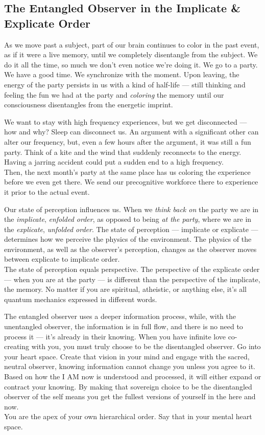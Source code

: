 \subsection*{The Entangled Observer in the Implicate \& Explicate
Order}\label{the-entangled-observer-in-the-implicate-explicate-order}

As we move past a subject, part of our brain continues to color in the
past event, as if it were a live memory, until we completely disentangle
from the subject. We do it all the time, so much we don't even notice
we're doing it. We go to a party. We have a good time. We synchronize
with the moment. Upon leaving, the energy of the party persists in us
with a kind of half-life --- still thinking and feeling the fun we had
at the party and \emph{coloring} the memory until our consciousness
disentangles from the energetic imprint.

We want to stay with high frequency experiences, but we get disconnected
--- how and why? Sleep can disconnect us. An argument with a significant
other can alter our frequency, but, even a few hours after the argument,
it was still a fun party. Think of a kite and the wind that suddenly
reconnects to the energy. Having a jarring accident could put a sudden
end to a high frequency.\\
Then, the next month's party at the same place has us coloring the
experience before we even get there. We send our precognitive workforce
there to experience it prior to the actual event.

Our state of perception influences us. When we \emph{think back on} the
party we are in the \emph{implicate}, \emph{enfolded order}, as opposed
to being \emph{at the party}, where we are in the \emph{explicate},
\emph{unfolded order}. The state of perception --- implicate or
explicate --- determines how we perceive the physics of the environment.
The physics of the environment, as well as the observer's perception,
changes as the observer moves between explicate to implicate order.\\
The state of perception equals perspective. The perspective of the
explicate order --- when you are at the party --- is different than the
perspective of the implicate, the memory. No matter if you are
spiritual, atheistic, or anything else, it's all quantum mechanics
expressed in different words.

The entangled observer uses a deeper information process, while, with
the unentangled observer, the information is in full flow, and there is
no need to process it --- it's already in their knowing. When you have
infinite love co-creating with you, you must truly choose to be the
disentangled observer. Go into your heart space. Create that vision in
your mind and engage with the sacred, neutral observer, knowing
information cannot change you unless you agree to it. Based on how the I
AM now is understood and processed, it will either expand or contract
your knowing. By making that sovereign choice to be the disentangled
observer of the self means you get the fullest versions of yourself in
the here and now.\\
You are the apex of your own hierarchical order. Say that in your mental
heart space.

